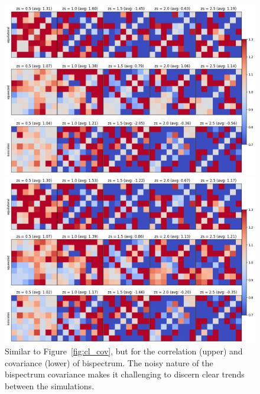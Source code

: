 \begin{figure}[p]
    \centering
    \includegraphics[width=\textwidth]{figures/results/bl_corr.png}
    \caption{Similar to Figure~\ref{fig:cl_cov}, but for the correlation (upper) and covariance (lower) of bispectrum. The noisy nature of the bispectrum covariance makes it challenging to discern clear trends between the simulations.}
    \label{fig:bl_cov}
    \vspace{0.5cm}
    \includegraphics[width=\textwidth]{figures/results/bl_cov.png}
\end{figure}

